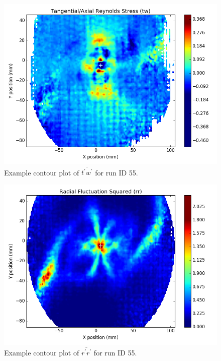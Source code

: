 {\begin{figure}[H]
	\centering
	\includegraphics[width=5in]{figs/example_vortex_figs/example_tw_contour}
\caption{Example contour plot of $\overline{t^\prime w^\prime}$ for run ID 55.}
\label{fig:examp_tw}
\end{figure}

\begin{figure}[H]
	\centering
	\includegraphics[width=5in]{figs/example_vortex_figs/example_rr_contour}
\caption{Example contour plot of $\overline{r^\prime r^\prime}$ for run ID 55.}
\label{fig:examp_rr}
\end{figure}

}

